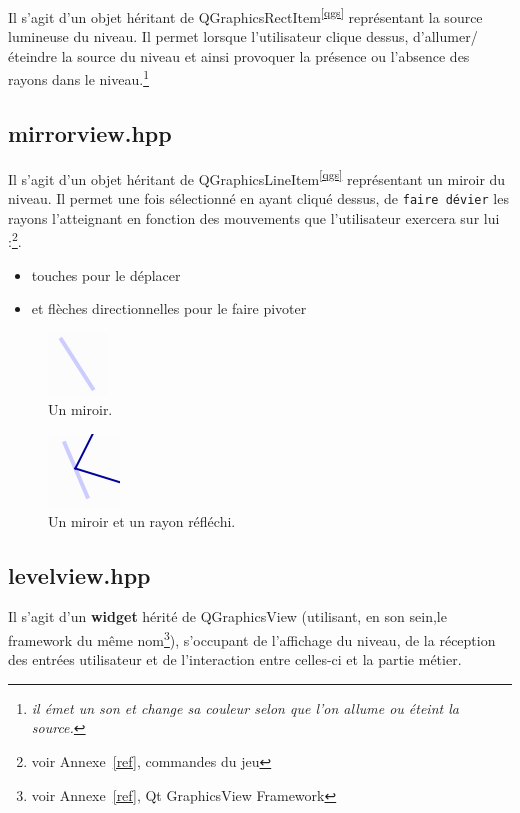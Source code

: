\documentclass[a4paper,11pt]{report}
\begin{document}
Il s'agit d'un objet héritant de QGraphicsRectItem\textsuperscript{\ref{qgs}} représentant la source
lumineuse du niveau. Il permet lorsque l'utilisateur clique dessus, 
d'allumer/éteindre la source du niveau et ainsi provoquer la présence ou 
l'absence des rayons dans le niveau.\footnote{\textit{il émet un son et change sa couleur selon que l'on allume ou
éteint la source.}}


		\newpage
\subsection[Le miroir]{mirrorview.hpp}
Il s'agit d'un objet héritant de QGraphicsLineItem\textsuperscript{\ref{qgs}} représentant un miroir du
niveau. Il permet une fois sélectionné en ayant cliqué dessus, de \texttt{faire
dévier} les rayons l'atteignant en fonction des mouvements que l'utilisateur exercera 
sur lui :\footnote{voir Annexe~\ref{ref}, commandes du jeu}.
\begin{itemize}
	\item touches pour le déplacer 
	\item et flèches directionnelles pour le faire pivoter
\end{itemize}

		\begin{figure}[h!]
			\caption{Un miroir.}
			\centering
			\includegraphics[keepaspectratio=true,width=0.2\linewidth]{./screenshots/elements_dyn/mirror}
		\end{figure}

		\begin{figure}[h!]
			\caption{Un miroir et un rayon réfléchi.}
			\centering
			\includegraphics[keepaspectratio=true,width=0.2\linewidth]{./screenshots/elements_dyn/mirror+ray}
		\end{figure}
\subsection[Le niveau]{levelview.hpp}
Il s'agit d'un \textbf{widget} hérité de QGraphicsView (utilisant, en son sein,le
framework du même nom\footnote{\label{qgv}voir Annexe~\ref{ref}, Qt GraphicsView
Framework}), s'occupant de l'affichage du niveau, de la réception
des entrées utilisateur et de l'interaction entre celles-ci et la partie
métier. 
\end{document}
